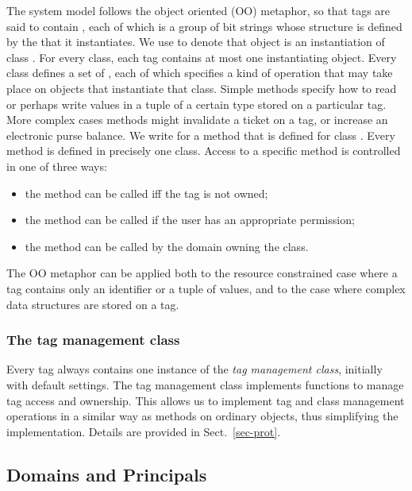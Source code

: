 The system model follows the object oriented (OO) metaphor, so that tags are
said to contain , each of which is a group of bit strings whose
structure is defined by the  that it instantiates.  
We use  to denote that object  is an instantiation of 
class .
For every class, each tag contains at most one instantiating object.
Every class defines a set of , each of which specifies a kind of
operation that may take place on objects that instantiate that class. Simple
methods specify how to read or perhaps write values in a tuple of a certain
type stored on a particular tag.  More complex cases methods might invalidate a
ticket on a tag, or increase an electronic purse balance.
We write  for a method  that is defined for 
class .  
Every method is defined in precisely one class.
Access to a specific method is controlled in one of three ways:
\begin{itemize}
	\item the method can be called iff the tag is not owned;
	\item the method can be called if the user has an appropriate permission;
	\item the method can be called by the domain owning the class.
\end{itemize}
The OO metaphor can be applied both to the resource constrained case where 
a tag contains only an identifier or a tuple of values, and to the case where 
complex data structures are stored on a tag.

\subsubsection{The tag management class}

Every tag always contains one instance  of the \emph{tag management class},
initially with default settings. 
The tag management class implements functions to manage tag access and ownership. 
This allows us to implement tag and class management operations in a similar way as methods on ordinary objects, thus simplifying the implementation. Details are provided in Sect.~\ref{sec-prot}.

\subsection{Domains and Principals}

